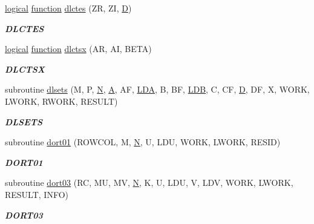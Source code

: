 \begin{DoxyCompactItemize}
\hyperlink{tnc_8c_aa7b64cdf39500931f7b333343791a104}{logical} \hyperlink{afunc_8m_a7b5e596df91eadea6c537c0825e894a7}{function} \hyperlink{group__double__eig_ga9773e3d39987ec10a5a58e224ff7582b}{dlctes} (Z\+R, Z\+I, \hyperlink{odrpack_8h_a7dae6ea403d00f3687f24a874e67d139}{D})
\begin{DoxyCompactList}\small\item\em {\bfseries D\+L\+C\+T\+E\+S} \end{DoxyCompactList}\item 
\hyperlink{tnc_8c_aa7b64cdf39500931f7b333343791a104}{logical} \hyperlink{afunc_8m_a7b5e596df91eadea6c537c0825e894a7}{function} \hyperlink{group__double__eig_ga14489af521606715c20ff53663f535c9}{dlctsx} (A\+R, A\+I, B\+E\+T\+A)
\begin{DoxyCompactList}\small\item\em {\bfseries D\+L\+C\+T\+S\+X} \end{DoxyCompactList}\item 
subroutine \hyperlink{group__double__eig_ga8f7f392f14da20c2cc0d33982627b1e4}{dlsets} (M, P, \hyperlink{polmisc_8c_a0240ac851181b84ac374872dc5434ee4}{N}, \hyperlink{classA}{A}, A\+F, \hyperlink{example__user_8c_ae946da542ce0db94dced19b2ecefd1aa}{L\+D\+A}, B, B\+F, \hyperlink{example__user_8c_a50e90a7104df172b5a89a06c47fcca04}{L\+D\+B}, C, C\+F, \hyperlink{odrpack_8h_a7dae6ea403d00f3687f24a874e67d139}{D}, D\+F, X, W\+O\+R\+K, L\+W\+O\+R\+K, R\+W\+O\+R\+K, R\+E\+S\+U\+L\+T)
\begin{DoxyCompactList}\small\item\em {\bfseries D\+L\+S\+E\+T\+S} \end{DoxyCompactList}\item 
subroutine \hyperlink{group__double__eig_ga4d1a5c2792c183c95bcab211a6c8027a}{dort01} (R\+O\+W\+C\+O\+L, M, \hyperlink{polmisc_8c_a0240ac851181b84ac374872dc5434ee4}{N}, U, L\+D\+U, W\+O\+R\+K, L\+W\+O\+R\+K, R\+E\+S\+I\+D)
\begin{DoxyCompactList}\small\item\em {\bfseries D\+O\+R\+T01} \end{DoxyCompactList}\item 
subroutine \hyperlink{group__double__eig_gab5b5f991af6cf4cbd658c1ceb7dd70bd}{dort03} (R\+C, M\+U, M\+V, \hyperlink{polmisc_8c_a0240ac851181b84ac374872dc5434ee4}{N}, K, U, L\+D\+U, V, L\+D\+V, W\+O\+R\+K, L\+W\+O\+R\+K, R\+E\+S\+U\+L\+T, I\+N\+F\+O)
\begin{DoxyCompactList}\small\item\em {\bfseries D\+O\+R\+T03} \end{DoxyCompactList}\item 

\end{DoxyCompactItemize}

